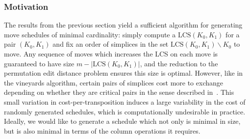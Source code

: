 \documentclass{siamart190516}
\DeclareMathOperator*{\argmin}{arg\,min}
\begin{document}
\subsubsection{Motivation}
The results from the previous section yield a sufficient algorithm for generating move schedules of minimal cardinality: simply compute a $\mathrm{LCS}(K_0, K_1)$ for a pair $(K_0, K_1)$ and fix an order of simplices in the set $\mathrm{LCS}(K_0, K_1) \smallsetminus K_0$ to move. Any sequence of moves which increases the LCS on each move is guaranteed to have size $m - \lvert \mathrm{LCS}(K_0, K_1) \rvert$, and the reduction to the permutation edit distance problem ensures this size is optimal. 
However, like in the vineyards algorithm, certain pairs of simplices cost more to exchange depending on whether they are critical pairs in the sense described in~\cite{cohen2006vines}. 
This small variation in cost-per-transposition induces a large variability in the cost of randomly generated schedules, which is computationally undesirable in practice. Ideally, we would like to generate a schedule which not only is minimal in size, but is also minimal in terms of the column operations it requires. 

\end{document}
